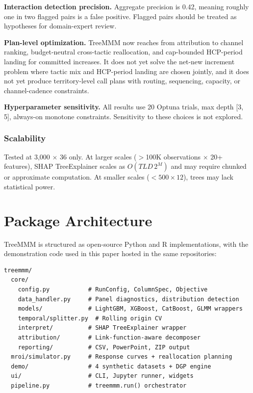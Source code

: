 \documentclass[review,12pt]{elsarticle}
\begin{document}
\textbf{Interaction detection precision.} Aggregate precision is 0.42, meaning
roughly one in two flagged pairs is a false positive. Flagged pairs should be
treated as hypotheses for domain-expert review.

\textbf{Plan-level optimization.} TreeMMM now reaches from attribution to
channel ranking, budget-neutral cross-tactic reallocation, and cap-bounded
HCP-period landing for committed increases. It does not yet solve the net-new
increment problem where tactic mix and HCP-period landing are chosen jointly,
and it does not yet produce territory-level call plans with routing, sequencing,
capacity, or channel-cadence constraints.

\textbf{Hyperparameter sensitivity.} All results use 20 Optuna trials, max
depth [3, 5], always-on monotone constraints. Sensitivity to these choices is
not explored.

\subsubsection{Scalability}
\label{sec:limits:scale}

Tested at 3,000 $\times$ 36 only. At larger scales ($>$100K observations $\times$
20+ features), SHAP TreeExplainer scales as $O(TLD\,2^M)$ and may require
chunked or approximate computation. At smaller scales ($< 500 \times 12$),
trees may lack statistical power.

\section{Package Architecture}
\label{sec:package}

TreeMMM is structured as open-source Python and R implementations, with
the demonstration code used in this paper hosted in the same repositories:

\begin{lstlisting}
treemmm/
  core/
    config.py           # RunConfig, ColumnSpec, Objective
    data_handler.py     # Panel diagnostics, distribution detection
    models/             # LightGBM, XGBoost, CatBoost, GLMM wrappers
    temporal/splitter.py  # Rolling origin CV
    interpret/          # SHAP TreeExplainer wrapper
    attribution/        # Link-function-aware decomposer
    reporting/          # CSV, PowerPoint, ZIP output
  mroi/simulator.py     # Response curves + reallocation planning
  demo/                 # 4 synthetic datasets + DGP engine
  ui/                   # CLI, Jupyter runner, widgets
  pipeline.py           # treemmm.run() orchestrator
\end{lstlisting}
\end{document}

